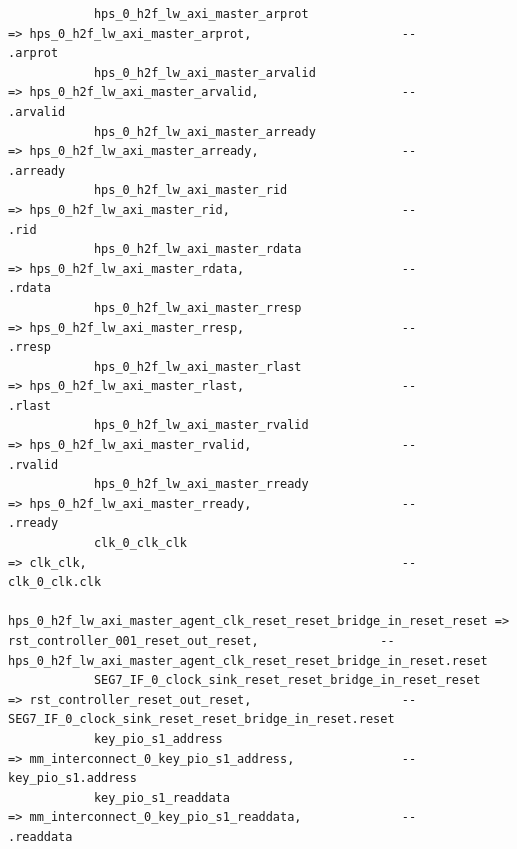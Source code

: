 \documentclass[conference]{IEEEtran}
\begin{document}
\begin{lstlisting}
			hps_0_h2f_lw_axi_master_arprot                                      => hps_0_h2f_lw_axi_master_arprot,                     --                                                              .arprot
			hps_0_h2f_lw_axi_master_arvalid                                     => hps_0_h2f_lw_axi_master_arvalid,                    --                                                              .arvalid
			hps_0_h2f_lw_axi_master_arready                                     => hps_0_h2f_lw_axi_master_arready,                    --                                                              .arready
			hps_0_h2f_lw_axi_master_rid                                         => hps_0_h2f_lw_axi_master_rid,                        --                                                              .rid
			hps_0_h2f_lw_axi_master_rdata                                       => hps_0_h2f_lw_axi_master_rdata,                      --                                                              .rdata
			hps_0_h2f_lw_axi_master_rresp                                       => hps_0_h2f_lw_axi_master_rresp,                      --                                                              .rresp
			hps_0_h2f_lw_axi_master_rlast                                       => hps_0_h2f_lw_axi_master_rlast,                      --                                                              .rlast
			hps_0_h2f_lw_axi_master_rvalid                                      => hps_0_h2f_lw_axi_master_rvalid,                     --                                                              .rvalid
			hps_0_h2f_lw_axi_master_rready                                      => hps_0_h2f_lw_axi_master_rready,                     --                                                              .rready
			clk_0_clk_clk                                                       => clk_clk,                                            --                                                     clk_0_clk.clk
			hps_0_h2f_lw_axi_master_agent_clk_reset_reset_bridge_in_reset_reset => rst_controller_001_reset_out_reset,                 -- hps_0_h2f_lw_axi_master_agent_clk_reset_reset_bridge_in_reset.reset
			SEG7_IF_0_clock_sink_reset_reset_bridge_in_reset_reset              => rst_controller_reset_out_reset,                     --              SEG7_IF_0_clock_sink_reset_reset_bridge_in_reset.reset
			key_pio_s1_address                                                  => mm_interconnect_0_key_pio_s1_address,               --                                                    key_pio_s1.address
			key_pio_s1_readdata                                                 => mm_interconnect_0_key_pio_s1_readdata,              --                                                              .readdata

\end{lstlisting}
\end{document}
